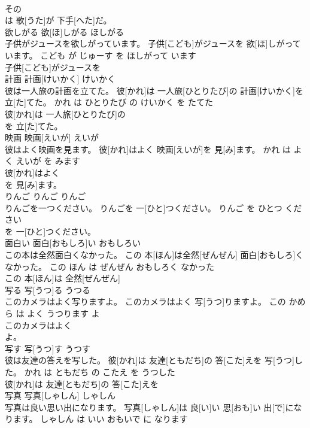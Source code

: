 \documentclass[8pt]{extreport}
\begin{document}
\begin{CJK}{UTF8}{min}
\\	その
\\	は 歌[うた]が 下手[へた]だ。			
\\	欲しがる	欲[ほ]しがる	ほしがる	
\\	子供がジュースを欲しがっています。	子供[こども]がジュースを 欲[ほ]しがっています。	こども が じゅーす を ほしがって います	
\\	子供[こども]がジュースを
\\	計画	計画[けいかく]	けいかく	
\\	彼は一人旅の計画を立てた。	彼[かれ]は 一人旅[ひとりたび]の 計画[けいかく]を 立[た]てた。	かれ は ひとりたび の けいかく を たてた	
\\	彼[かれ]は 一人旅[ひとりたび]の
\\	を 立[た]てた。			
\\	映画	映画[えいが]	えいが	
\\	彼はよく映画を見ます。	彼[かれ]はよく 映画[えいが]を 見[み]ます。	かれ は よく えいが を みます	
\\	彼[かれ]はよく
\\	を 見[み]ます。			
\\	りんご	りんご	りんご	
\\	りんごを一つください。	りんごを 一[ひと]つください。	りんご を ひとつ ください	
\\	を 一[ひと]つください。			
\\	面白い	面白[おもしろ]い	おもしろい	
\\	この本は全然面白くなかった。	この 本[ほん]は全然[ぜんぜん] 面白[おもしろ]くなかった。	この ほん は ぜんぜん おもしろく なかった	
\\	この 本[ほん]は 全然[ぜんぜん]
\\	写る	写[うつ]る	うつる	
\\	このカメラはよく写りますよ。	このカメラはよく 写[うつ]りますよ。	この かめら は よく うつります よ	
\\	このカメラはよく
\\	よ。			
\\	写す	写[うつ]す	うつす	
\\	彼は友達の答えを写した。	彼[かれ]は 友達[ともだち]の 答[こた]えを 写[うつ]した。	かれ は ともだち の こたえ を うつした	
\\	彼[かれ]は 友達[ともだち]の 答[こた]えを
\\	写真	写真[しゃしん]	しゃしん	
\\	写真は良い思い出になります。	写真[しゃしん]は 良[い]い 思[おも]い 出[で]になります。	しゃしん は いい おもいで に なります	

\end{CJK}
\end{document}
